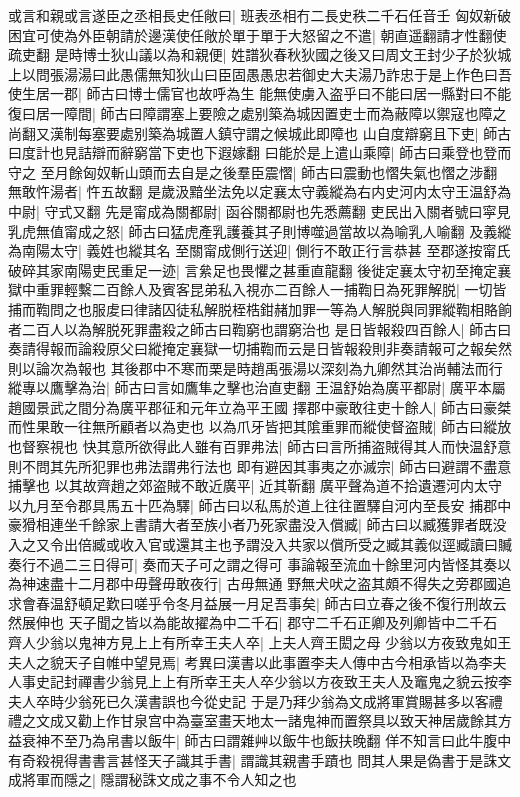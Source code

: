 或言和親或言遂臣之丞相長史任敞曰|{
	班表丞相冇二長史秩二千石任音壬}
匈奴新破困宜可使為外臣朝請於邊漢使任敞於單于單于大怒留之不遣|{
	朝直遥翻請才性翻使疏吏翻}
是時博士狄山議以為和親便|{
	姓譜狄春秋狄國之後又曰周文王封少子於狄城}
上以問張湯湯曰此愚儒無知狄山曰臣固愚愚忠若御史大夫湯乃詐忠于是上作色曰吾使生居一郡|{
	師古曰博士儒官也故呼為生}
能無使虜入盗乎曰不能曰居一縣對曰不能復曰居一障間|{
	師古曰障謂塞上要險之處别築為城因置吏士而為蔽障以禦寇也障之尚翻又漢制每塞要處别築為城置人鎮守謂之候城此即障也}
山自度辯窮且下吏|{
	師古曰度計也見詰辯而辭窮當下吏也下遐嫁翻}
曰能於是上遣山乘障|{
	師古曰乘登也登而守之}
至月餘匈奴斬山頭而去自是之後羣臣震慴|{
	師古曰震動也慴失氣也慴之涉翻}
無敢忤湯者|{
	忤五故翻}
是歲汲黯坐法免以定襄太守義縱為右内史河内太守王温舒為中尉|{
	守式又翻}
先是甯成為關都尉|{
	函谷關都尉也先悉薦翻}
吏民出入關者號曰寜見乳虎無值甯成之怒|{
	師古曰猛虎產乳護養其子則博噬過當故以為喻乳人喻翻}
及義縱為南陽太守|{
	義姓也縱其名}
至關甯成側行送迎|{
	側行不敢正行言恭甚}
至郡遂按甯氏破碎其家南陽吏民重足一迹|{
	言絫足也畏懼之甚重直龍翻}
後徙定襄太守初至掩定襄獄中重罪輕繫二百餘人及賓客昆弟私入視亦二百餘人一捕鞫日為死罪解脱|{
	一切皆捕而鞫問之也服䖍曰律諸囚徒私解脱桎梏鉗赭加罪一等為人解脱與同罪縱鞫相賂餉者二百人以為解脱死罪盡殺之師古曰鞫窮也謂窮治也}
是日皆報殺四百餘人|{
	師古曰奏請得報而論殺原父曰縱掩定襄獄一切捕鞫而云是日皆報殺則非奏請報可之報矣然則以論次為報也}
其後郡中不寒而栗是時趙禹張湯以深刻為九卿然其治尚輔法而行縱專以鷹擊為治|{
	師古曰言如鷹隼之擊也治直吏翻}
王温舒始為廣平都尉|{
	廣平本屬趙國景武之間分為廣平郡征和元年立為平王國}
擇郡中豪敢往吏十餘人|{
	師古曰豪桀而性果敢一往無所顧者以為吏也}
以為爪牙皆把其隂重罪而縱使督盗賊|{
	師古曰縱放也督察視也}
快其意所欲得此人雖有百罪弗法|{
	師古曰言所捕盗賊得其人而快温舒意則不問其先所犯罪也弗法謂弗行法也}
即有避因其事夷之亦滅宗|{
	師古曰避謂不盡意捕擊也}
以其故齊趙之郊盗賊不敢近廣平|{
	近其靳翻}
廣平聲為道不拾遺遷河内太守以九月至令郡具馬五十匹為驛|{
	師古曰以私馬於道上往往置驛自河内至長安}
捕郡中豪猾相連坐千餘家上書請大者至族小者乃死家盡没入償臧|{
	師古曰以臧獲罪者既没入之又令出倍臧或收入官或還其主也予謂没入共家以償所受之臧其義似逕臧讀曰贓}
奏行不過二三日得可|{
	奏而天子可之謂之得可}
事論報至流血十餘里河内皆怪其奏以為神速盡十二月郡中毋聲毋敢夜行|{
	古毋無通}
野無犬吠之盗其頗不得失之旁郡國追求會春温舒頓足歎曰嗟乎令冬月益展一月足吾事矣|{
	師古曰立春之後不復行刑故云然展伸也}
天子聞之皆以為能故擢為中二千石|{
	郡守二千石正卿及列卿皆中二千石}
齊人少翁以鬼神方見上上有所幸王夫人卒|{
	上夫人齊王閎之母}
少翁以方夜致鬼如王夫人之貌天子自帷中望見焉|{
	考異曰漢書以此事置李夫人傳中古今相承皆以為李夫人事史記封禪書少翁見上上有所幸王夫人卒少翁以方夜致王夫人及竈鬼之貌云按李夫人卒時少翁死已久漢書誤也今從史記}
于是乃拜少翁為文成將軍賞賜甚多以客禮禮之文成又勸上作甘泉宫中為臺室畫天地太一諸鬼神而置祭具以致天神居歲餘其方益衰神不至乃為帛書以飯牛|{
	師古曰謂雜艸以飯牛也飯扶晚翻}
佯不知言曰此牛腹中有奇殺視得書書言甚怪天子識其手書|{
	謂識其親書手蹟也}
問其人果是偽書于是誅文成將軍而隱之|{
	隱謂秘誅文成之事不令人知之也}



